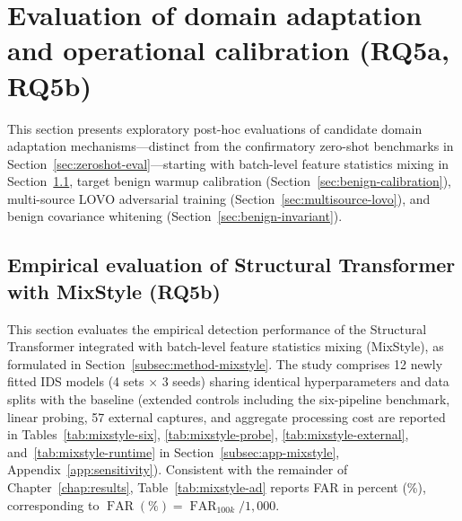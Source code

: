 \documentclass[12pt, a4paper, reqno, oneside]{book}
\begin{document}
\section{Evaluation of domain adaptation and operational calibration (RQ5a, RQ5b)}\label{sec:adaptation-eval}
This section presents exploratory post-hoc evaluations of candidate domain adaptation mechanisms---distinct from the confirmatory zero-shot benchmarks in Section~\ref{sec:zeroshot-eval}---starting with batch-level feature statistics mixing in Section~\ref{sec:mixstyle-study}, target benign warmup calibration (Section~\ref{sec:benign-calibration}), multi-source LOVO adversarial training (Section~\ref{sec:multisource-lovo}), and benign covariance whitening (Section~\ref{sec:benign-invariant}).

\subsection{Empirical evaluation of Structural Transformer with MixStyle (RQ5b)}\label{sec:mixstyle-study}
This section evaluates the empirical detection performance of the Structural Transformer integrated with batch-level feature statistics mixing (MixStyle), as formulated in Section~\ref{subsec:method-mixstyle}. The study comprises 12 newly fitted IDS models (4 sets $\times$ 3 seeds) sharing identical hyperparameters and data splits with the baseline (extended controls including the six-pipeline benchmark, linear probing, 57 external captures, and aggregate processing cost are reported in Tables~\ref{tab:mixstyle-six}, \ref{tab:mixstyle-probe}, \ref{tab:mixstyle-external}, and~\ref{tab:mixstyle-runtime} in Section~\ref{subsec:app-mixstyle}, Appendix~\ref{app:sensitivity}). Consistent with the remainder of Chapter~\ref{chap:results}, Table~\ref{tab:mixstyle-ad} reports FAR in percent (\%), corresponding to $\operatorname{FAR}(\%) = \operatorname{FAR}_{100k}/1{,}000$.
\end{document}
